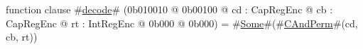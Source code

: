function clause #\hyperref[zdecode]{decode}# (0b010010 @ 0b00100 @ cd : CapRegEnc @ cb : CapRegEnc @ rt : IntRegEnc @ 0b000 @ 0b000) = #\hyperref[zSome]{Some}#(#\hyperref[zCAndPerm]{CAndPerm}#(cd, cb, rt))
